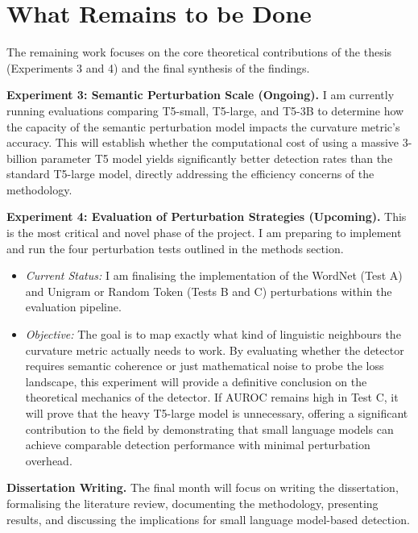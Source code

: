 \documentclass[a4paper,11pt]{article}
\begin{document}
\section{What Remains to be Done}
The remaining work focuses on the core theoretical contributions of the thesis (Experiments 3 and 4) and the final synthesis of the findings.

\textbf{Experiment 3: Semantic Perturbation Scale (Ongoing).} 
I am currently running evaluations comparing T5-small, T5-large, and T5-3B to determine how the capacity of the semantic perturbation model impacts the curvature metric's accuracy. This will establish whether the computational cost of using a massive 3-billion parameter T5 model yields significantly better detection rates than the standard T5-large model, directly addressing the efficiency concerns of the methodology.

\textbf{Experiment 4: Evaluation of Perturbation Strategies (Upcoming).} 
This is the most critical and novel phase of the project. I am preparing to implement and run the four perturbation tests outlined in the methods section. 
\begin{itemize}
    \item \textit{Current Status:} I am finalising the implementation of the WordNet (Test A) and Unigram or Random Token (Tests B and C) perturbations within the evaluation pipeline. 
    \item \textit{Objective:} The goal is to map exactly what kind of linguistic neighbours the curvature metric actually needs to work. By evaluating whether the detector requires semantic coherence or just mathematical noise to probe the loss landscape, this experiment will provide a definitive conclusion on the theoretical mechanics of the detector. If AUROC remains high in Test C, it will prove that the heavy T5-large model is unnecessary, offering a significant contribution to the field by demonstrating that small language models can achieve comparable detection performance with minimal perturbation overhead.
\end{itemize}

\textbf{Dissertation Writing.} 
The final month will focus on writing the dissertation, formalising the literature review, documenting the methodology, presenting results, and discussing the implications for small language model-based detection.
\end{document}
